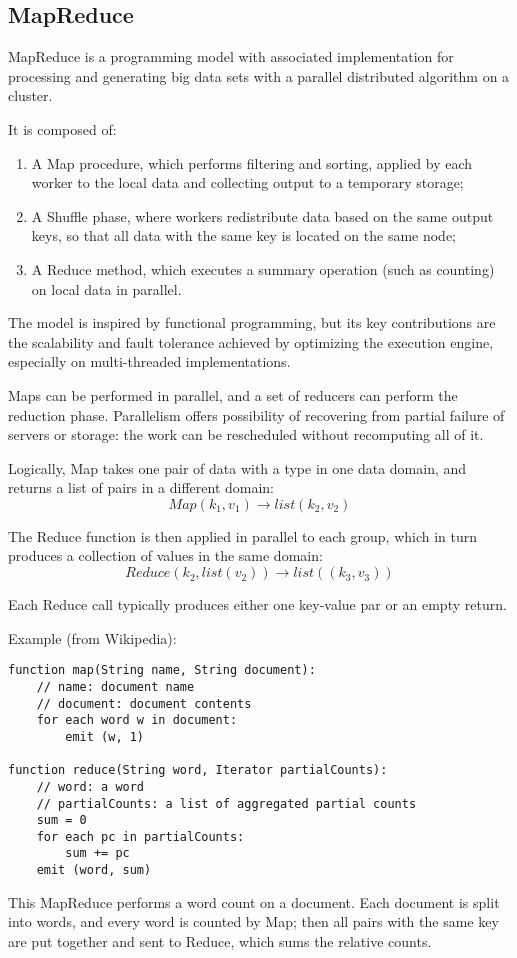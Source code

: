 \subsection{MapReduce}
MapReduce is a programming model with associated implementation for processing and generating big data sets with a parallel distributed algorithm on a cluster.

It is composed of:
\begin{enumerate}
	\item A Map procedure, which performs filtering and sorting, applied by each worker to the local data and collecting output to a temporary storage;
	\item A Shuffle phase, where workers redistribute data based on the same output keys, so that all data with the same key is located on the same node;
	\item A Reduce method, which executes a summary operation (such as counting) on local data in parallel.
\end{enumerate}

The model is inspired by functional programming, but its key contributions are the scalability and fault tolerance achieved by optimizing the execution engine, especially on multi-threaded implementations. 

Maps can be performed in parallel, and a set of reducers can perform the reduction phase. Parallelism offers possibility of recovering from partial failure of servers or storage: the work can be rescheduled without recomputing all of it.

Logically, Map takes one pair of data with a type in one data domain, and returns a list of pairs in a different domain:
$$Map(k_1, v_1) \rightarrow list(k_2, v_2)$$

The Reduce function is then applied in parallel to each group, which in turn produces a collection of values in the same domain:
$$Reduce(k_2, list(v_2)) \rightarrow list((k_3, v_3))$$

Each Reduce call typically produces either one key-value par or an empty return.

Example (from Wikipedia):
\begin{lstlisting}
function map(String name, String document):
	// name: document name
	// document: document contents
	for each word w in document:
		emit (w, 1)

function reduce(String word, Iterator partialCounts):
	// word: a word
	// partialCounts: a list of aggregated partial counts
	sum = 0
	for each pc in partialCounts:
		sum += pc
	emit (word, sum)
\end{lstlisting}
This MapReduce performs a word count on a document. Each document is split into words, and every word is counted by Map; then all pairs with the same key are put together and sent to Reduce, which sums the relative counts.

